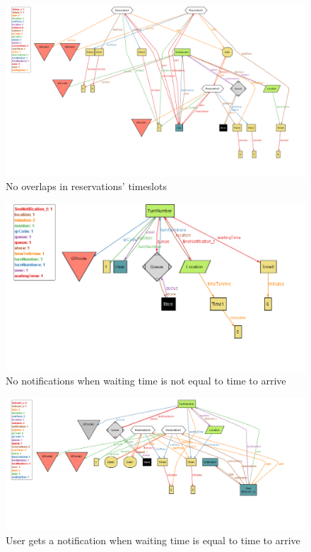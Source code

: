 \documentclass{article}
\begin{document}
\begin{figure}[H]
  \includegraphics[width=\linewidth]{NoOverlapReservations}
  \caption{No overlaps in reservations' timeslots}
  
\end{figure}

\begin{figure}[H]
  \includegraphics[width=\linewidth]{NoNotification}
  \caption{No notifications when waiting time is not equal to time to arrive}
  
\end{figure}

\begin{figure}[H]
  \includegraphics[width=\linewidth]{yesNotification}
  \caption{User gets a notification when waiting time is equal to time to arrive}
  
\end{figure}
\end{document}
